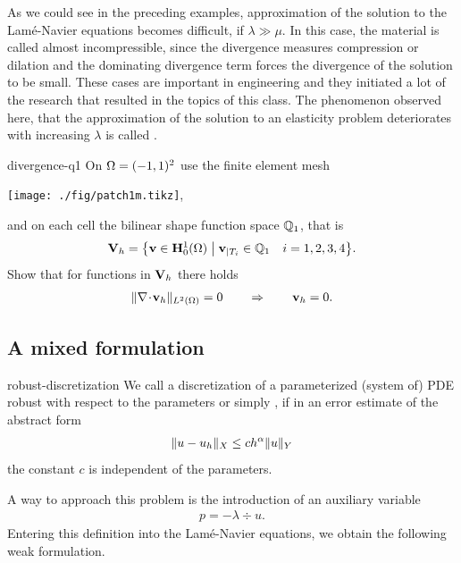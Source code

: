 \begin{intro}
  As we could see in the preceding examples, approximation
  of the solution to the Lamé-Navier equations becomes difficult, if
  $\lambda \gg \mu$. In this case, the material is called almost
  incompressible, since the divergence measures compression or
  dilation and the dominating divergence term forces the divergence of
  the solution to be small. These cases are important in engineering
  and they initiated a lot of the research that resulted in the topics
  of this class. The phenomenon observed here, that the approximation
  of the solution to an elasticity problem deteriorates with
  increasing $\lambda$ is called .
\end{intro}

\begin{Problem}{divergence-q1}
  On $\Omega = (-1,1)^2$ use the finite element mesh
  \begin{center}
  \texttt{[image: ./fig/patch1m.tikz]}, 
  \end{center}
  and on each cell the bilinear shape function space $\mathbb Q_1$, that is
  \begin{gather}
    \mathbf V_h = \bigl\{ \mathbf v\in \mathbf H^1_0(\Omega) \;\big|\;
    \mathbf v_{|T_i} \in \mathbb Q_1\quad i=1,2,3,4\bigr\}.
  \end{gather}
  Show that for functions in $\mathbf V_h$ there holds
  \begin{gather}
    \lVert\nabla\!\cdot\! \mathbf v_h\rVert_{L^2(\Omega)} = 0
    \qquad\Rightarrow\qquad
    \mathbf v_h = 0.
  \end{gather}
\end{Problem}
\subsection{A mixed formulation}

\begin{Definition}{robust-discretization}
  We call a discretization of a parameterized (system of) PDE robust
  with respect to the parameters or simply , if in an
  error estimate of the abstract form
  \begin{gather}
    \lVert u-u_h\rVert_X \le c h^\alpha \lVert u\rVert_Y
  \end{gather}
  the constant $c$ is independent of the parameters.
\end{Definition}

A way to approach this problem is the introduction of an auxiliary variable
\begin{gather}
  p = -\lambda \div u.
\end{gather}
Entering this definition into the Lamé-Navier equations, we obtain
the following weak formulation.


